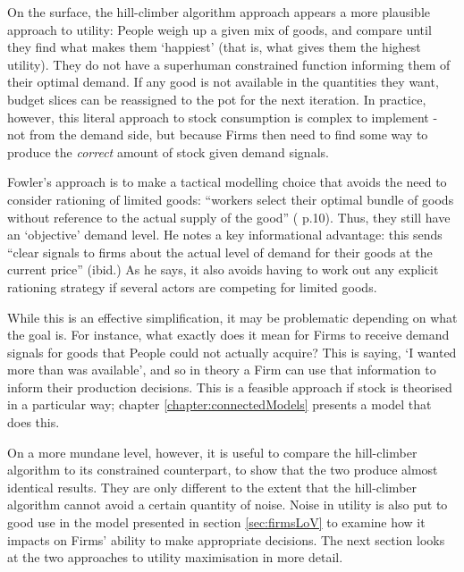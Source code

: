 On the surface, the hill-climber algorithm approach appears a more plausible approach to utility: People weigh up a given mix of goods, and compare until they find what makes them `happiest' (that is, what gives them the highest utility). They do not have a superhuman constrained function informing them of their optimal demand. If any good is not available in the quantities they want, budget slices can be reassigned to the pot for the next iteration. In practice, however, this literal approach to stock consumption is complex to implement - not from the demand side, but because Firms then need to find some way to produce the \emph{correct} amount of stock given demand signals.

Fowler's approach is to make a tactical modelling choice that avoids the need to consider rationing of limited goods: ``workers select their optimal bundle of goods without reference to the actual supply of the good'' (\citealt{fowler_finding_2011} p.10). Thus, they still have an `objective' demand level. He notes a key informational advantage: this sends ``clear signals to firms about the actual level of demand for their goods at the current price'' (ibid.) As he says, it also avoids having to work out any explicit rationing strategy if several actors are competing for limited goods. 

While this is an effective simplification, it may be problematic depending on what the goal is. For instance, what exactly does it mean for Firms to receive demand signals for goods that People could not actually acquire? This is saying, `I wanted more than was available', and so in theory a Firm can use that information to inform their production decisions. This is a feasible approach if stock is theorised in a particular way; chapter \ref{chapter:connectedModels} presents a model that does this.

On a more mundane level, however, it is useful to compare the hill-climber algorithm to its constrained counterpart, to show that the two produce almost identical results. They are only different to the extent that the hill-climber algorithm cannot avoid a certain quantity of noise. Noise in utility is also put to good use in the model presented in section \ref{sec:firmsLoV} to examine how it impacts on Firms' ability to make appropriate decisions. The next section looks at the two approaches to utility maximisation in more detail.
